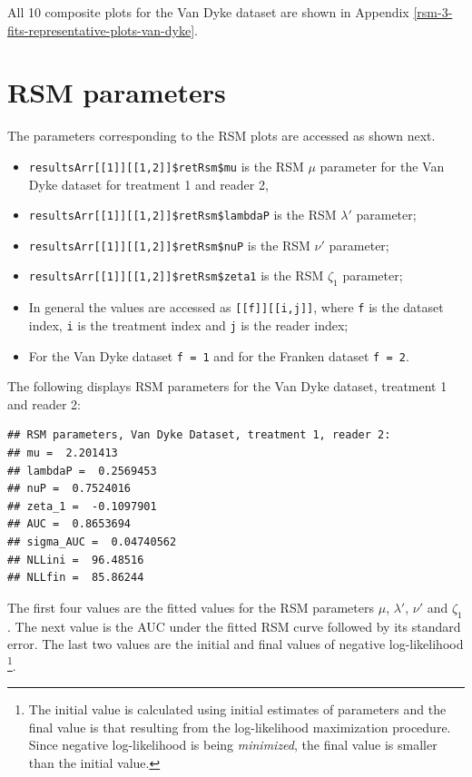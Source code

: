 \documentclass[
]{book}
\providecommand{\tightlist}{%
  \setlength{\itemsep}{0pt}\setlength{\parskip}{0pt}}
\begin{document}
All 10 composite plots for the Van Dyke dataset are shown in Appendix \ref{rsm-3-fits-representative-plots-van-dyke}.

\hypertarget{rsm-3-fits-rsm-parameters}{%
\section{RSM parameters}\label{rsm-3-fits-rsm-parameters}}

The parameters corresponding to the RSM plots are accessed as shown next.

\begin{itemize}
\tightlist
\item
  \texttt{resultsArr{[}{[}1{]}{]}{[}{[}1,2{]}{]}\$retRsm\$mu} is the RSM \(\mu\) parameter for the Van Dyke dataset for treatment 1 and reader 2,
\item
  \texttt{resultsArr{[}{[}1{]}{]}{[}{[}1,2{]}{]}\$retRsm\$lambdaP} is the RSM \(\lambda'\) parameter;\\
\item
  \texttt{resultsArr{[}{[}1{]}{]}{[}{[}1,2{]}{]}\$retRsm\$nuP} is the RSM \(\nu'\) parameter;
\item
  \texttt{resultsArr{[}{[}1{]}{]}{[}{[}1,2{]}{]}\$retRsm\$zeta1} is the RSM \(\zeta_1\) parameter;
\item
  In general the values are accessed as \texttt{{[}{[}f{]}{]}{[}{[}i,j{]}{]}}, where \texttt{f} is the dataset index, \texttt{i} is the treatment index and \texttt{j} is the reader index;
\item
  For the Van Dyke dataset \texttt{f\ =\ 1} and for the Franken dataset \texttt{f\ =\ 2}.
\end{itemize}

The following displays RSM parameters for the Van Dyke dataset, treatment 1 and reader 2:

\begin{verbatim}
## RSM parameters, Van Dyke Dataset, treatment 1, reader 2: 
## mu =  2.201413 
## lambdaP =  0.2569453 
## nuP =  0.7524016 
## zeta_1 =  -0.1097901 
## AUC =  0.8653694 
## sigma_AUC =  0.04740562 
## NLLini =  96.48516 
## NLLfin =  85.86244
\end{verbatim}

The first four values are the fitted values for the RSM parameters \(\mu\), \(\lambda'\), \(\nu'\) and \(\zeta_1\). The next value is the AUC under the fitted RSM curve followed by its standard error. The last two values are the initial and final values of negative log-likelihood \footnote{The initial value is calculated using initial estimates of parameters and the final value is that resulting from the log-likelihood maximization procedure. Since negative log-likelihood is being \emph{minimized}, the final value is smaller than the initial value.}.
\end{document}
